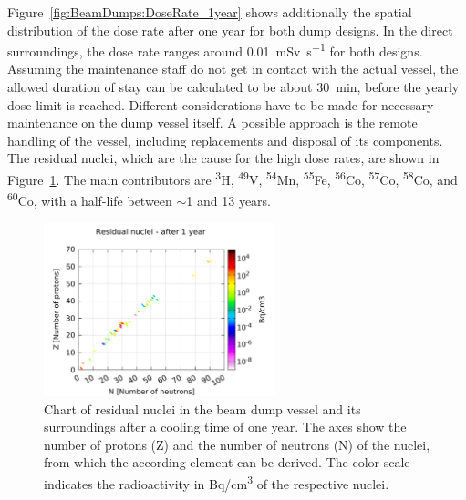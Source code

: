 Figure~\ref{fig:BeamDumps:DoseRate_1year} shows additionally the spatial distribution of the dose rate after one year for both dump designs.
In the direct surroundings, the dose rate ranges around \SI{0.01}{\milli\sievert\per\second} for both designs.
Assuming the maintenance staff do not get in contact with the actual vessel, the allowed duration of stay can be calculated to be about \SI{30}{\minute}, before the yearly dose limit is reached.
Different considerations have to be made for necessary maintenance on the dump vessel itself.
A possible approach is the remote handling of the vessel, including replacements and disposal of its components.
\\The residual nuclei, which are the cause for the high dose rates, are shown in Figure~\ref{fig:BeamDumps:ResidualNuclei}.
The main contributors are \textsuperscript{3}H, \textsuperscript{49}V, \textsuperscript{54}Mn, \textsuperscript{55}Fe, \textsuperscript{56}Co, \textsuperscript{57}Co, \textsuperscript{58}Co, and \textsuperscript{60}Co, with a half-life between $\sim$1 and 13 years.

\begin{figure}[!h]
\centering
\includegraphics[width=0.6\textwidth]{Figures/BeamDump/Corrected_residualnuclei_plots/ResidualNuclei_Design2_5_correct_scale.pdf}
\caption[Residual nuclei in the ILC main beam dump after one year]{Chart of residual nuclei in the beam dump vessel and its surroundings after a cooling time of one year.
The axes show the number of protons (Z) and the number of neutrons (N) of the nuclei, from which the according element can be derived.
The color scale indicates the radioactivity in \si[detect-all]{\becquerel}/\si{\centi\meter\cubed} of the respective nuclei.}
\label{fig:BeamDumps:ResidualNuclei}
\end{figure}
\FloatBarrier
 
